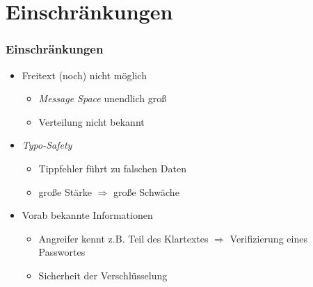 \section{Einschränkungen}

\begin{frame}[t]
	\frametitle{Einschränkungen}
	
	\begin{itemize}
		\item Freitext (noch) nicht möglich
		\begin{itemize}
			\item \emph{Message Space} unendlich groß
			\item Verteilung nicht bekannt
		\end{itemize}
		
		\item \emph{Typo-Safety}
		\begin{itemize}
			\item Tippfehler führt zu falschen Daten
			\item große Stärke $\Rightarrow$ große Schwäche
		\end{itemize}

		\item Vorab bekannte Informationen
		\begin{itemize}
			\item Angreifer kennt z.B. Teil des Klartextes $\Rightarrow$ Verifizierung eines Passwortes
			\item Sicherheit der Verschlüsselung
		\end{itemize}
	\end{itemize}	
	
\end{frame}